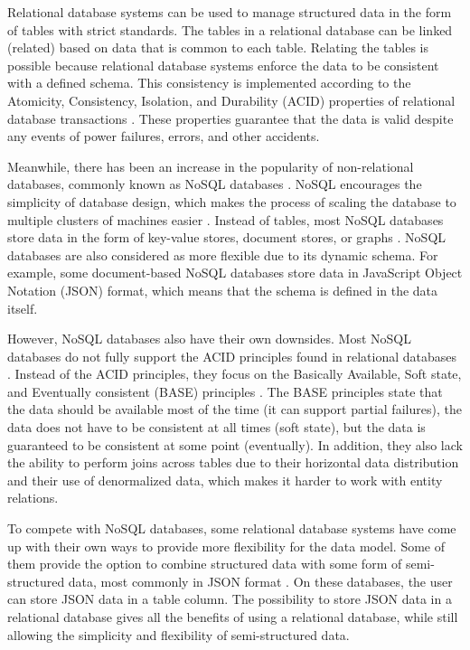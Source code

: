 Relational database systems can be used to manage structured data in the form
of tables with strict standards. The tables in a relational database can be
linked (related) based on data that is common to each table. Relating the
tables is possible because relational database systems enforce the data to be
consistent with a defined schema. This consistency is implemented according to
the Atomicity, Consistency, Isolation, and Durability (ACID) properties of
relational database transactions \cite{abramova_nosql}. These properties
guarantee that the data is valid despite any events of power failures, errors,
and other accidents.

Meanwhile, there has been an increase in the popularity of non-relational
databases, commonly known as NoSQL databases \cite{paul_nosql}. NoSQL
encourages the simplicity of database design, which makes the process of
scaling the database to multiple clusters of machines easier
\cite{leavitt_nosql}. Instead of tables, most NoSQL databases store data in the
form of key-value stores, document stores, or graphs \cite{strauch_nosql}.
NoSQL databases are also considered as more flexible due to its dynamic schema.
For example, some document-based NoSQL databases store data in JavaScript
Object Notation (JSON) format, which means that the schema is defined in the
data itself.

However, NoSQL databases also have their own downsides. Most NoSQL databases do
not fully support the ACID principles found in relational databases
\cite{cattell_nosql}. Instead of the ACID principles, they focus on the
Basically Available, Soft state, and Eventually consistent (BASE) principles
\cite{abramova_nosql}. The BASE principles state that the data should be
available most of the time (it can support partial failures), the data does not
have to be consistent at all times (soft state), but the data is guaranteed to
be consistent at some point (eventually). In addition, they also lack the
ability to perform joins across tables due to their horizontal data
distribution \cite{pokorny_nosql} and their use of denormalized data, which
makes it harder to work with entity relations.

To compete with NoSQL databases, some relational database systems have come up
with their own ways to provide more flexibility for the data model. Some of
them provide the option to combine structured data with some form of
semi-structured data, most commonly in JSON format \cite{mariadb_json}. On
these databases, the user can store JSON data in a table column. The
possibility to store JSON data in a relational database gives all the benefits
of using a relational database, while still allowing the simplicity and
flexibility of semi-structured data.

